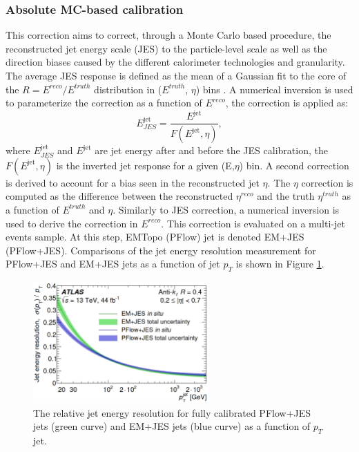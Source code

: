 \subsubsection{Absolute MC-based calibration}
\label{Jet:Cal:chain:JES}
This correction aims to correct, through a Monte Carlo based procedure, the reconstructed jet energy scale (JES) to the particle-level scale as well as the direction biases caused by the different calorimeter technologies and granularity. The average JES response is defined as the mean of a Gaussian fit to the core of the $R=E^{reco}/E^{truth}$ distribution in ($E^{truth}$, $\eta$) bins \cite{Old_JES, Old_JES_Sys}. A numerical inversion is used to parameterize the correction as a function of $E^{reco}$, the correction is applied as: 
\begin{equation}
    E_{JES}^{\mathrm{jet}}=\frac{E^{\mathrm{jet}}}{F(E^{\mathrm{jet}},\eta)},
\end{equation}
where $E_{JES}^{\mathrm{jet}}$ and $E^{\mathrm{jet}}$ are jet energy after and before the JES calibration, the $F(E^{\mathrm{jet}}, \eta)$ is the inverted jet response for a given (E,$\eta$) bin. A second correction is derived to account for a bias seen in the reconstructed jet $\eta$. The $\eta$ correction is computed as the difference between the reconstructed $\eta^{reco}$ and the truth $\eta^{truth}$ as a function of $E^{truth}$ and $\eta$. Similarly to JES correction, a numerical inversion is used to derive the correction in $E^{reco}$. This correction is evaluated on a multi-jet events sample. At this step, EMTopo (PFlow) jet is denoted EM+JES (PFlow+JES). Comparisons of the jet energy resolution measurement for PFlow+JES and EM+JES jets as a function of jet $p_T$ is shown in Figure \ref{fig:Jet:Cal:chain:JER}.
\begin{figure}[htbp]
    \centering
    \includegraphics[width=0.6\textwidth]{Ch4/Img/Jet_Resolution_Topo_vs_PFlow.png}
    \caption{The relative jet energy resolution for fully calibrated PFlow+JES jets (green curve) and EM+JES jets (blue curve) as a function of $p_T$ jet.}
    \label{fig:Jet:Cal:chain:JER}
\end{figure}

